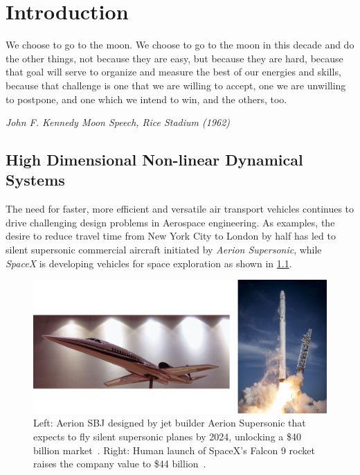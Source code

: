 \chapter{Introduction}

\label{chap:intro} 
\epigraph{We choose to go to the moon. We choose to go to the moon in this decade and do the other things, not because they are easy, but because they are hard, because that goal will serve to organize and measure the best of our energies and skills, because that challenge is one that we are willing to accept, one we are unwilling to postpone, and one which we intend to win, and the others, too.}{\textit{John F. Kennedy Moon Speech, Rice Stadium (1962)}}




\section{High Dimensional Non-linear Dynamical Systems}

The need for faster, more efficient and versatile air transport vehicles continues to drive challenging design problems in Aerospace engineering. As examples, the desire to reduce travel time from New York City to London by half has led to silent supersonic commercial aircraft initiated by \textit{Aerion Supersonic}, while \textit{SpaceX} is developing vehicles for space exploration as shown in \cref{fig:intro-backgrounds}.

\begin{figure}[htb]
\centering
\includegraphics[width=\textwidth]{Intro/intro.png}
\caption{Left: Aerion SBJ designed by jet builder Aerion Supersonic that expects to fly silent supersonic planes by 2024, unlocking a \$40 billion market~\citep{wiki:as2}. Right: Human launch of SpaceX's Falcon 9 rocket raises the company value to \$44 billion~\citep{wiki:fal9}.}
\label{fig:intro-backgrounds}
\end{figure}
